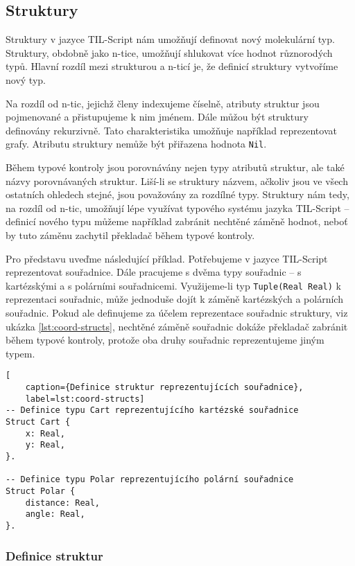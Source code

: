 \subsection{Struktury}\label{structs}

Struktury v jazyce TIL-Script nám umožňují definovat nový molekulární typ. Struktury, obdobně jako
n-tice, umožňují shlukovat více hodnot různorodých typů. Hlavní rozdíl mezi strukturou a n-ticí je,
že definicí struktury vytvoříme nový typ.

Na rozdíl od n-tic, jejichž členy indexujeme číselně, atributy struktur jsou pojmenované a
přistupujeme k nim jménem. Dále můžou být struktury definovány rekurzivně. Tato charakteristika
umožňuje například reprezentovat grafy. Atributu struktury nemůže být přiřazena hodnota
\lstinline{Nil}.

Během typové kontroly jsou porovnávány nejen typy atributů struktur, ale také názvy porovnávaných
struktur. Liší-li se struktury názvem, ačkoliv jsou ve všech ostatních ohledech stejné, jsou
považovány za rozdílné typy. Struktury nám tedy, na rozdíl od n-tic, umožňují lépe využívat typového
systému jazyka TIL-Script -- definicí nového typu můžeme například zabránit nechtěné záměně hodnot,
neboť by tuto záměnu zachytil překladač během typové kontroly.

Pro představu uveďme následující příklad. Potřebujeme v jazyce TIL-Script reprezentovat souřadnice.
Dále pracujeme s dvěma typy souřadnic -- s kartézskými a s polárními souřadnicemi. Využijeme-li
typ \lstinline{Tuple(Real Real)} k reprezentaci souřadnic, může jednoduše dojít k záměně
kartézských a polárních souřadnic. Pokud ale definujeme za účelem reprezentace souřadnic struktury,
viz ukázka \ref{lst:coord-structs}, nechtěné záměně souřadnic dokáže překladač zabránit během
typové kontroly, protože oba druhy souřadnic reprezentujeme jiným typem.

\begin{lstlisting}[
    caption={Definice struktur reprezentujících souřadnice},
    label=lst:coord-structs]
-- Definice typu Cart reprezentujícího kartézské souřadnice
Struct Cart {
    x: Real,
    y: Real,
}.

-- Definice typu Polar reprezentujícího polární souřadnice
Struct Polar {
    distance: Real,
    angle: Real,
}.
\end{lstlisting}

\subsubsection{Definice struktur}

